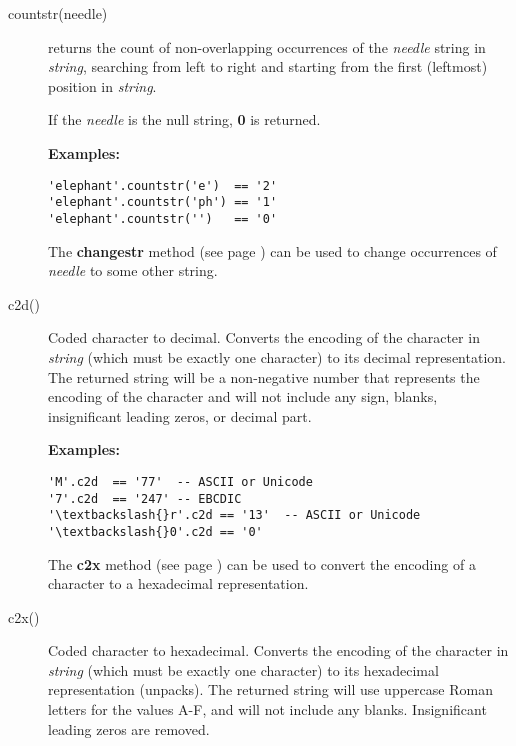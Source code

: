 \begin{description}
\item[countstr(needle)]\label{refcoustr}
returns the count of non-overlapping occurrences of the
\emph{needle} string in \emph{string}, searching from left to
right and starting from the first (leftmost) position in
\emph{string}.
 
If the \emph{needle} is the null string, \textbf{0} is returned.
 
\textbf{Examples:}
\begin{lstlisting}
'elephant'.countstr('e')  == '2'
'elephant'.countstr('ph') == '1'
'elephant'.countstr('')   == '0'
\end{lstlisting}
 The  \textbf{changestr} method (see page \pageref{refchastr})  can be used to
change occurrences of \emph{needle} to some other string.
\item[c2d()]\label{refc2d}

Coded character to decimal.
Converts the encoding of the character in \emph{string} (which must be
exactly one character) to its decimal representation.
The returned string will be a non-negative number that represents
the encoding of the character and will not include any sign, blanks,
insignificant leading zeros, or decimal part.
 
\textbf{Examples:}
\begin{lstlisting}
'M'.c2d  == '77'  -- ASCII or Unicode
'7'.c2d  == '247' -- EBCDIC
'\textbackslash{}r'.c2d == '13'  -- ASCII or Unicode
'\textbackslash{}0'.c2d == '0'
\end{lstlisting}
 The  \textbf{c2x} method (see page \pageref{refc2x})  can be used to
convert the encoding of a character to a hexadecimal representation.
\item[c2x()]\label{refc2x}

Coded character to hexadecimal.
Converts the encoding of the character in \emph{string} (which must be
exactly one character) to its hexadecimal representation (unpacks).
The returned string will use uppercase Roman letters for the values A-F,
and will not include any blanks.
Insignificant leading zeros are removed.
 

\end{description}
